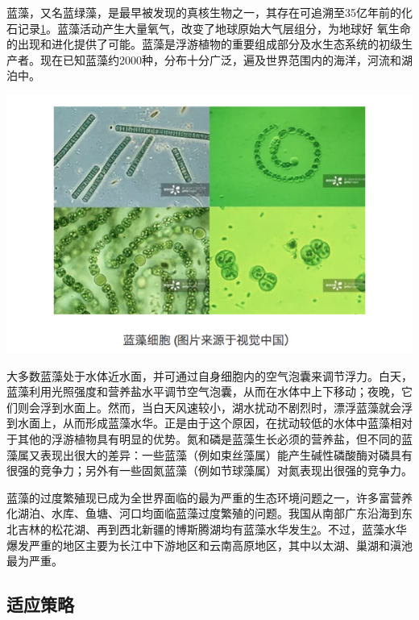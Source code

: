 \documentclass[
]{book}
\begin{document}
蓝藻，又名蓝绿藻，是最早被发现的真核生物之一，其存在可追溯至35亿年前的化石记录\href{陈心想，耿增超。西北农林科技大学学报（自然科学版），2013，41:\%20167-174．}{1}。蓝藻活动产生大量氧气，改变了地球原始大气层组分，为地球好 氧生命的出现和进化提供了可能。蓝藻是浮游植物的重要组成部分及水生态系统的初级生产者。现在已知蓝藻约2000种，分布十分广泛，遍及世界范围内的海洋，河流和湖泊中。

\includegraphics[width=8.33in]{images/lanzao1}

大多数蓝藻处于水体近水面，并可通过自身细胞内的空气泡囊来调节浮力。白天，蓝藻利用光照强度和营养盐水平调节空气泡囊，从而在水体中上下移动；夜晚，它们则会浮到水面上。然而，当白天风速较小，湖水扰动不剧烈时，漂浮蓝藻就会浮到水面上，从而形成蓝藻水华。正是由于这个原因，在扰动较低的水体中蓝藻相对于其他的浮游植物具有明显的优势。氮和磷是蓝藻生长必须的营养盐，但不同的蓝藻属又表现出很大的差异：一些蓝藻（例如束丝藻属）能产生碱性磷酸酶对磷具有很强的竞争力；另外有一些固氮蓝藻（例如节球藻属）对氮表现出很强的竞争力。

蓝藻的过度繁殖现已成为全世界面临的最为严重的生态环境问题之一，许多富营养化湖泊、水库、鱼塘、河口均面临蓝藻过度繁殖的问题。我国从南部广东沿海到东北吉林的松花湖、再到西北新疆的博斯腾湖均有蓝藻水华发生\href{Kezhen\%20Qian,\%20Ajay\%20Kumar,\%20et.al.\%20Renew.\%20and\%20Sustain.\%20Energy\%20Reviews,\%202015,\%2042:\%201055-1064.}{2}。不过，蓝藻水华爆发严重的地区主要为长江中下游地区和云南高原地区，其中以太湖、巢湖和滇池最为严重。

\hypertarget{ux9002ux5e94ux7b56ux7565}{%
\subsection{适应策略}\label{ux9002ux5e94ux7b56ux7565}}
\end{document}
